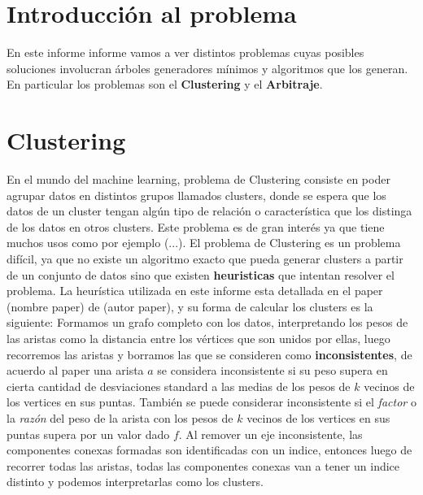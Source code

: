 \documentclass[8pt,a4paper]{article}
\begin{document}

\fecha{\today}



\maketitle

\newpage
%

\section{Introducción al problema}
En este informe informe vamos a ver distintos problemas cuyas posibles soluciones involucran árboles generadores mínimos y algoritmos que los generan. En particular los problemas son el \textbf{Clustering} y el \textbf{Arbitraje}.

\section{Clustering}
En el mundo del machine learning, problema de Clustering consiste en poder agrupar datos en distintos grupos llamados clusters, donde se espera que los datos de un cluster tengan algún tipo de relación o característica que los distinga de los datos en otros clusters. Este problema es de gran interés ya que tiene muchos usos como por ejemplo (...).
%
%
El problema de Clustering es un problema difícil, ya que no existe un algoritmo exacto que pueda generar clusters a partir de un conjunto de datos sino que existen \textbf{heuristicas} que intentan resolver el problema. La heurística utilizada en este informe esta detallada en el paper (nombre paper) de (autor paper), y su forma de calcular los clusters es la siguiente: Formamos un grafo completo con los datos, interpretando los pesos de las aristas como la distancia entre los vértices que son unidos por ellas, luego recorremos las aristas y borramos las que se consideren como \textbf{inconsistentes}, de acuerdo al paper una arista $a$ se considera inconsistente si su peso supera en cierta cantidad de desviaciones standard a las medias de los pesos de $k$ vecinos de los vertices en sus puntas. También se puede considerar inconsistente si el \textit{factor} o la \textit{razón} del peso de la arista con los pesos de $k$ vecinos de los vertices en sus puntas supera por un valor dado $f$. Al remover un eje inconsistente, las componentes conexas formadas son identificadas con un indice, entonces luego de recorrer todas las aristas, todas las componentes conexas van a tener un  indice distinto y podemos interpretarlas como los clusters.
\end{document}
